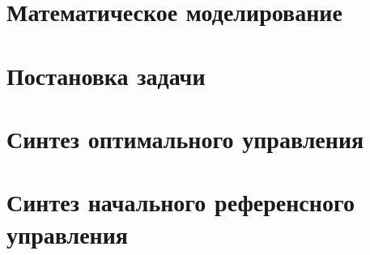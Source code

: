 



\usepackage{subfiles}
\graphicspath{{\subfix{./img}}}

        
        \tableofcontents
        \clearpage
        \section{Математическое моделирование}
                
                
                
                \clearpage

        \section{Постановка задачи}
                
                
                \clearpage

        \section{Синтез оптимального управления}
                
                
                
                
                \clearpage
        
        \section{Синтез начального референсного управления}
                
                
                
                \clearpage
        \cite{texbook}
        \clearpage
        

